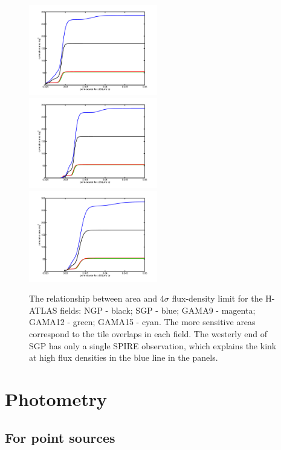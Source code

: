 \documentclass[useAMS,usenatbib]{mnras}
\begin{document}
\begin{figure} %
\includegraphics[width=0.5\textwidth]{flux_area_250.pdf}
\includegraphics[width=0.5\textwidth]{flux_area_350.pdf}
\includegraphics[width=0.5\textwidth]{flux_area_500.pdf}
\caption{The relationship between area and 4$\sigma$ flux-density
  limit for the H-ATLAS fields: NGP - black; SGP - blue; GAMA9 -
  magenta; GAMA12 - green; GAMA15 - cyan.  The more sensitive areas
  correspond to the tile overlaps in each field.  The westerly end of
  SGP has only a single SPIRE observation, which explains the kink at
  high flux densities in the blue line in the panels.}

\label{fig_areas}
\end{figure}

\section{Photometry}

\subsection{For point sources}
\end{document}
